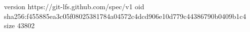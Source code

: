 version https://git-lfs.github.com/spec/v1
oid sha256:f455885ea3c05f08025381784a04572c4dcd906e10d779c44386790b0409b1c4
size 43802
